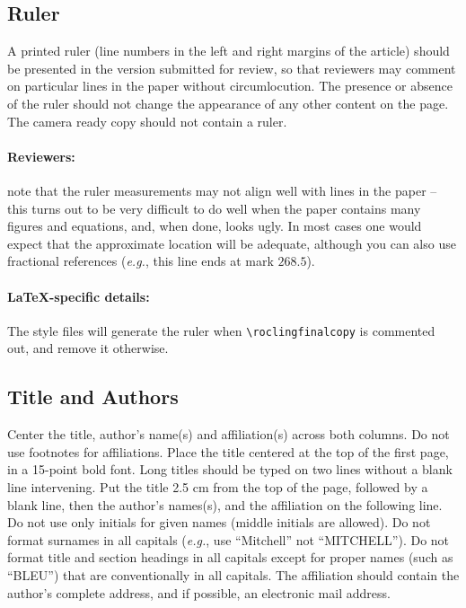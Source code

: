 \documentclass[11pt,a4paper]{article}
\begin{document}
\subsection{Ruler}
A printed ruler (line numbers in the left and right margins of the article) should be presented in the version submitted for review, so that reviewers may comment on particular lines in the paper without circumlocution.
The presence or absence of the ruler should not change the appearance of any other content on the page.
The camera ready copy should not contain a ruler.

\paragraph{Reviewers:}
note that the ruler measurements may not align well with lines in the paper -- this turns out to be very difficult to do well when the paper contains many figures and equations, and, when done, looks ugly.
In most cases one would expect that the approximate location will be adequate, although you can also use fractional references (\emph{e.g.}, this line ends at mark $268.5$).

\paragraph{\LaTeX-specific details:}
The style files will generate the ruler when {\small\verb|\roclingfinalcopy|} is commented out, and remove it otherwise.

\subsection{Title and Authors}
\label{ssec:title-authors}

Center the title, author's name(s) and affiliation(s) across both columns.
Do not use footnotes for affiliations.
Place the title centered at the top of the first page, in a 15-point bold font.
Long titles should be typed on two lines without a blank line intervening.
Put the title 2.5 cm from the top of the page, followed by a blank line, then the author's names(s), and the affiliation on the following line.
Do not use only initials for given names (middle initials are allowed).
Do not format surnames in all capitals (\emph{e.g.}, use ``Mitchell'' not ``MITCHELL'').
Do not format title and section headings in all capitals except for proper names (such as ``BLEU'') that are
conventionally in all capitals.
The affiliation should contain the author's complete address, and if possible, an electronic mail address.
\end{document}
